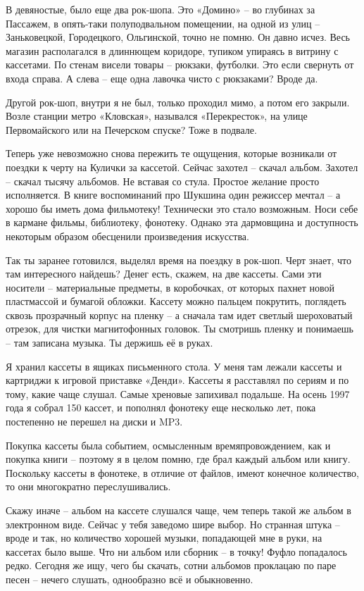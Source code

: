 В девяностые, было еще два рок-шопа. Это «Домино» – во глубинах за Пассажем, в опять-таки полуподвальном помещении, на одной из улиц – Заньковецкой, Городецкого, Ольгинской, точно не помню. Он давно исчез. Весь магазин располагался в длиннющем коридоре, тупиком упираясь в витрину с кассетами. По стенам висели товары – рюкзаки, футболки. Это если свернуть от входа справа. А слева – еще одна лавочка чисто с рюкзаками? Вроде да.

Другой рок-шоп, внутри я не был, только проходил мимо, а потом его закрыли. Возле станции метро «Кловская», назывался «Перекресток», на улице Первомайского или на Печерском спуске? Тоже в подвале.

Теперь уже невозможно снова пережить те ощущения, которые возникали от поездки к черту на Кулички за кассетой. Сейчас захотел – скачал альбом. Захотел – скачал тысячу альбомов. Не вставая со стула. Простое желание просто исполняется. В книге воспоминаний про Шукшина один режиссер мечтал – а хорошо бы иметь дома фильмотеку! Технически это стало возможным. Носи себе в кармане фильмы, библиотеку, фонотеку. Однако эта дармовщина и доступность некоторым образом обесценили произведения искусства.

Так ты заранее готовился, выделял время на поездку в рок-шоп. Черт знает, что там интересного найдешь? Денег есть, скажем, на две кассеты. Сами эти носители – материальные предметы, в коробочках, от которых пахнет новой пластмассой и бумагой обложки. Кассету можно пальцем покрутить, поглядеть сквозь прозрачный корпус на пленку – а сначала там идет светлый шероховатый отрезок, для чистки магнитофонных головок. Ты смотришь пленку и понимаешь – там записана музыка. Ты держишь её в руках.

Я хранил кассеты в ящиках письменного стола. У меня там лежали кассеты и картриджи к игровой приставке «Денди». Кассеты я расставлял по сериям и по тому, какие чаще слушал. Самые хреновые запихивал подальше. На осень 1997 года я собрал 150 кассет, и пополнял фонотеку еще несколько лет, пока постепенно не перешел на диски и MP3.

Покупка кассеты была событием, осмысленным времяпровождением, как и покупка книги – поэтому я в целом помню, где брал каждый альбом или книгу. Поскольку кассеты в фонотеке, в отличие от файлов, имеют конечное количество, то они многократно переслушивались. 

Скажу иначе – альбом на кассете слушался чаще, чем теперь такой же альбом в электронном виде. Сейчас у тебя заведомо шире выбор. Но странная штука – вроде и так, но количество хорошей музыки, попадающей мне в руки, на кассетах было выше. Что ни альбом или сборник – в точку! Фуфло попадалось редко. Сегодня же ищу, чего бы скачать, сотни альбомов проклацаю по паре песен – нечего слушать, однообразно всё и обыкновенно.

